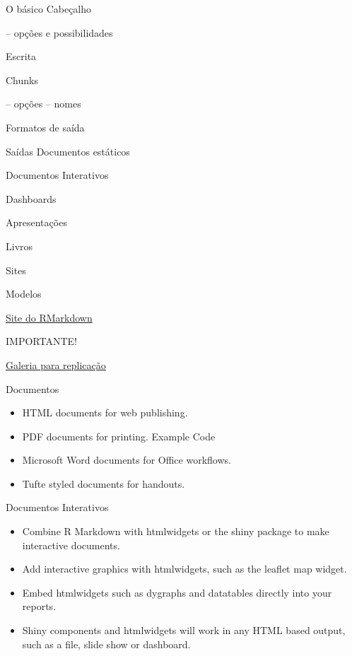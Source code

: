 \documentclass[
  9pt,
  ignorenonframetext,
]{beamer}
\begin{document}
\begin{frame}{O básico}
\protect\hypertarget{o-buxe1sico}{}
Cabeçalho

-- opções e possibilidades

Escrita

Chunks

-- opções -- nomes

Formatos de saída
\end{frame}

\begin{frame}{Saídas}
\protect\hypertarget{sauxeddas}{}
Documentos estáticos

Documentos Interativos

Dashboards

Apresentações

Livros

Sites

Modelos
\end{frame}

\begin{frame}{}
\protect\hypertarget{section-3}{}
\href{https://rmarkdown.rstudio.com/}{Site do RMarkdown}

IMPORTANTE!

\href{https://rmarkdown.rstudio.com/gallery.html}{Galeria para
replicação}
\end{frame}

\begin{frame}{Documentos}
\protect\hypertarget{documentos}{}
\begin{itemize}
\item
  HTML documents for web publishing.
\item
  PDF documents for printing. Example Code
\item
  Microsoft Word documents for Office workflows.
\item
  Tufte styled documents for handouts.
\end{itemize}
\end{frame}

\begin{frame}{Documentos Interativos}
\protect\hypertarget{documentos-interativos}{}
\begin{itemize}
\item
  Combine R Markdown with htmlwidgets or the shiny package to make
  interactive documents.
\item
  Add interactive graphics with htmlwidgets, such as the leaflet map
  widget.
\item
  Embed htmlwidgets such as dygraphs and datatables directly into your
  reports.
\item
  Shiny components and htmlwidgets will work in any HTML based output,
  such as a file, slide show or dashboard.
\end{itemize}
\end{frame}
\end{document}
